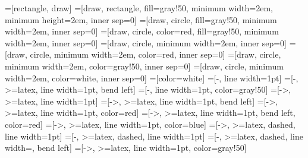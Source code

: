 \newcommand{\SR}[2]{\textcolor{gray}{#1}\textcolor{red}{#2}}
\newcommand{\todo}[1]{\textcolor{red}{\`A faire~: {\sl #1}}}
\newcommand{\dessin}[1]{
\bigskip
\begin{breakbox} \noindent \textcolor{purple}{{\sl #1}} \end{breakbox}
}
\newcommand{\progres}[1]{
\newpage
\begin{breakbox} \noindent \textcolor{blue}{{\sl #1}} \end{breakbox}
}
\newcommand{\solution}[1]{
\bigskip
\begin{breakbox} \parsl{Solution.}
  \noindent #1
\end{breakbox}
\medskip
}
\newcommand{\exemple}[1]{
\bigskip
\begin{breakbox} \parbfsl{Exemple.}
  \noindent #1
\end{breakbox}
\medskip
}
\newcommand{\warning}[1]{(\textcolor{red}{\faWarning\ #1})}
\newcommand{\SRcorrect}[2]{\textcolor{gray}{#1}\textcolor{blue}{#2}}
\newcommand{\SRcomment}[1]{\textcolor{blue}{[{\sl SR: #1}]}}

\newcommand{\nodesize}{2em}
\newcommand{\edgeunit}{2.5*\nodesize}
=[rectangle, draw]
=[draw, rectangle, fill=gray!50, minimum width=\nodesize, minimum height=\nodesize, inner sep=0]
=[draw, circle, fill=gray!50, minimum width=\nodesize, inner sep=0]
=[draw, circle, color=red, fill=gray!50, minimum width=\nodesize, inner sep=0]
=[draw, circle, minimum width=\nodesize, inner sep=0]
=[draw, circle, minimum width=\nodesize, color=red, inner sep=0]
=[draw, circle, minimum width=\nodesize, color=gray!50, inner sep=0]
=[draw, circle, minimum width=\nodesize, color=white, inner sep=0]
=[color=white]
=[-, line width=1pt]
=[-, >=latex, line width=1pt, bend left]
=[-, line width=1pt, color=gray!50]
=[->, >=latex, line width=1pt]
=[->, >=latex, line width=1pt, bend left]
=[->, >=latex, line width=1pt, color=red]
=[->, >=latex, line width=1pt, bend left, color=red]
=[->, >=latex, line width=1pt, color=blue]
=[->, >=latex, dashed, line width=1pt]
=[-, >=latex, dashed, line width=1pt]
=[-, >=latex, dashed, line width=\edgewidth, bend left]
=[->, >=latex, line width=1pt, color=gray!50]

